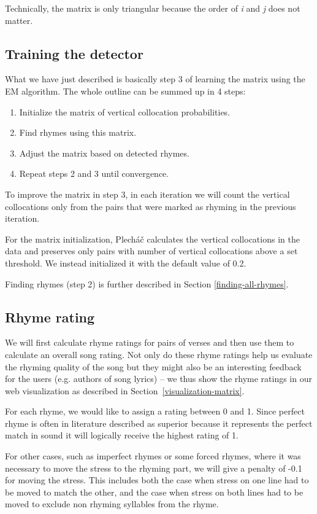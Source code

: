 Technically, the matrix is only triangular because the order of \textit{i} and \textit{j} does not matter.

\subsection{Training the detector} \label{analysis:training}
What we have just described is basically step 3 of learning the matrix using the EM algorithm. The whole outline can be summed up in 4 steps:
\begin{enumerate}
	\item Initialize the matrix of vertical collocation probabilities.
	\item Find rhymes using this matrix.
	\item Adjust the matrix based on detected rhymes.
	\item Repeat steps 2 and 3 until convergence.
\end{enumerate} 

To improve the matrix in step 3, in each iteration we will count the vertical collocations only from the pairs that were marked as rhyming in the previous iteration.


For the matrix initialization, Plecháč calculates the vertical collocations in the data and preserves only pairs with number of vertical collocations above a set threshold. We instead initialized it with the default value of 0.2. 

Finding rhymes (step 2) is further described in Section \ref{finding-all-rhymes}.


\subsection{Rhyme rating}\label{rhyme-rating}
 We will first calculate rhyme ratings for pairs of verses and then use them to calculate an overall song rating. Not only do these rhyme ratings help us evaluate the rhyming quality of the song but they might also be an interesting feedback for the users (e.g. authors of song lyrics) -- we thus show the rhyme ratings in our web visualization as described in Section~\ref{visualization-matrix}.
 
 
 For each rhyme, we would like to assign a rating between 0 and 1. Since perfect rhyme is often in literature described as superior because it represents the perfect match in sound it will logically receive the highest rating of 1.
 
 For other cases, such as imperfect rhymes or some forced rhymes, where it was necessary to move the stress to the rhyming part, we will give a penalty of -0.1 for moving the stress. This includes both the case when stress on one line had to be moved to match the other, and the case when stress on both lines had to be moved to exclude non rhyming syllables from the rhyme.
  
